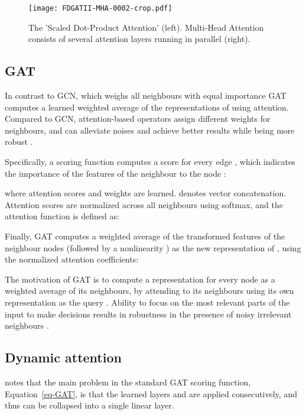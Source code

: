 \documentclass{article}
\begin{document}
\begin{figure}[h]
    \centering \texttt{[image: FDGATII-MHA-0002-crop.pdf]} 
    \caption{The \citet{vaswani2017attention} 'Scaled Dot-Product Attention' (left). Multi-Head Attention consists of several attention layers running in parallel (right).}
    \label{fig_attention}
\end{figure}

\subsection{GAT}
In contrast to GCN, which weighs all neighbours  with equal importance GAT \cite{velivckovic2018graph} computes a learned weighted average of the representations of  using attention. Compared to GCN, attention-based operators assign different weights for neighbours, and can alleviate noises and achieve better results \cite{zhou2020graph} while being more robust \cite{alon2020bottleneck}. 

Specifically, a scoring function  computes a score for every edge , which indicates the importance of the features of the neighbour  to the node : 
 



 

where attention scores  and weights  are learned.  denotes vector concatenation. Attention scores are normalized across all neighbours  using softmax, and the attention function is defined as:
 

Finally, GAT computes a weighted average of the transformed features of the neighbour nodes (followed by a nonlinearity ) as the new representation of , using the normalized attention coefficients:
 

The motivation of GAT is to compute a representation for every node as a weighted average of its neighbours, by attending to its neighbours using its own representation as the query \cite{velivckovic2018graph}. Ability to focus on the most relevant parts of the input to make decisions results in robustness in the presence of noisy irrelevant neighbours \cite{alon2020bottleneck}.

\subsection{Dynamic attention}
\citet{brody2021attentive} notes that the main problem in the standard GAT scoring function, Equation~\ref{eq-GAT}, is that the learned layers  and  are applied consecutively, and thus can be collapsed into a single linear layer.
\end{document}
